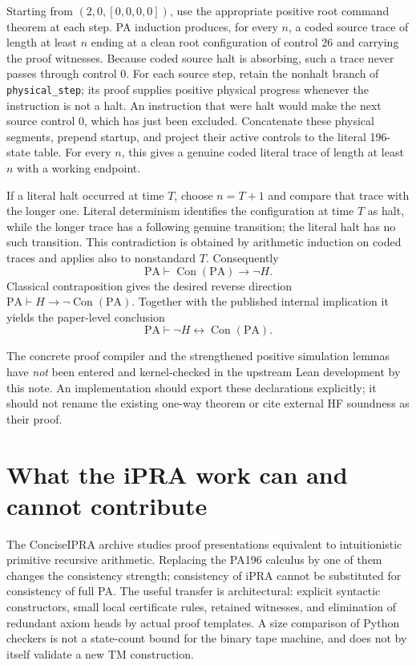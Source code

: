 \documentclass[11pt]{article}
\newcommand{\PA}{\mathrm{PA}}
\newcommand{\Con}{\operatorname{Con}}
\begin{document}
Starting from $(2,0,[0,0,0,0])$, use the appropriate positive root
command theorem at each step.  PA induction produces, for every
$n$, a coded source trace of length at least $n$ ending at a clean
root configuration of control $26$ and carrying the proof witnesses.
Because coded source halt is absorbing, such a trace never passes
through control $0$.  For each source step, retain the nonhalt
branch of \texttt{physical\_step}; its proof supplies positive
physical progress whenever the instruction is not a halt.  An
instruction that were halt would make the next source control $0$,
which has just been excluded.  Concatenate these physical segments,
prepend startup, and project their active controls to the literal
196-state table.  For every $n$, this gives a genuine coded literal
trace of length at least $n$ with a working endpoint.

If a literal halt occurred at time $T$, choose $n=T+1$ and compare
that trace with the longer one.  Literal determinism identifies the
configuration at time $T$ as halt, while the longer trace has a
following genuine transition; the literal halt has no such
transition.  This contradiction is obtained by arithmetic induction
on coded traces and applies also to nonstandard $T$.  Consequently
\[
 \PA\vdash\Con(\PA)\to\neg H.
\]
Classical contraposition gives the desired reverse direction
$\PA\vdash H\to\neg\Con(\PA)$.  Together with the published
internal implication it yields the paper-level conclusion
\[
 \PA\vdash\neg H\leftrightarrow\Con(\PA).
\]

The concrete proof compiler and the strengthened positive simulation
lemmas have \emph{not} been entered and kernel-checked in the upstream
Lean development by this note.  An implementation should export
these declarations explicitly; it should not rename the existing
one-way theorem or cite external HF soundness as their proof.

\section{What the iPRA work can and cannot contribute}

The ConciseIPRA archive studies proof presentations equivalent to
intuitionistic primitive recursive arithmetic.  Replacing the PA196
calculus by one of them changes the consistency strength; consistency
of iPRA cannot be substituted for consistency of full PA.  The useful
transfer is architectural: explicit syntactic constructors, small
local certificate rules, retained witnesses, and elimination of
redundant axiom heads by actual proof templates.  A size comparison
of Python checkers is not a state-count bound for the binary tape
machine, and does not by itself validate a new TM construction.
\end{document}

